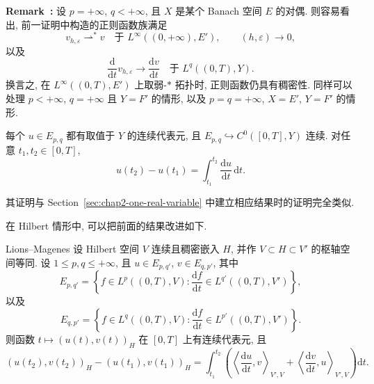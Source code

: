 \par\noindent{}\textbf{Remark~\thechapterfiveremark:}\quad
\label{rem:chap2-epq-weak-star-density}
设 $p=+\infty$, $q<+\infty$, 且 $X$ 是某个 Banach 空间 $E$ 的对偶. 则容易看出, 前一证明中构造的正则函数族满足
\[
 v_{h,\varepsilon}\rightharpoonup^*v
 \quad\text{于 }L^\infty((0,+\infty),E'),
 \qquad (h,\varepsilon)\to0,
\]
以及
\[
 \frac{\mathrm{d}}{\mathrm{d}t}v_{h,\varepsilon}
 \longrightarrow\frac{\mathrm{d}v}{\mathrm{d}t}
 \quad\text{于 }L^q((0,T),Y).
\]
换言之, 在 $L^\infty((0,T),E')$ 上取弱-$*$ 拓扑时, 正则函数仍具有稠密性. 同样可以处理 $p<+\infty$, $q=+\infty$ 且 $Y=F'$ 的情形, 以及 $p=q=+\infty$, $X=E'$, $Y=F'$ 的情形.
\par

\begin{Proposition}
\label{prop:chap2-epq-continuous-representative}
每个 $u\in E_{p,q}$ 都有取值于 $Y$ 的连续代表元, 且 $E_{p,q}\hookrightarrow C^0([0,T],Y)$ 连续. 对任意 $t_1,t_2\in[0,T]$,
\[
 u(t_2)-u(t_1)=\int_{t_1}^{t_2}\frac{\mathrm{d}u}{\mathrm{d}t}\,\mathrm{d}t.
\]
\end{Proposition}

\begin{Proof}
其证明与 Section~\ref{sec:chap2-one-real-variable} 中建立相应结果时的证明完全类似.
\end{Proof}

在 Hilbert 情形中, 可以把前面的结果改进如下.

\begin{Theorem}{Lions--Magenes}
\label{thm:chap2-lions-magenes-product}
设 Hilbert 空间 $V$ 连续且稠密嵌入 $H$, 并作 $V\subset H\subset V'$ 的枢轴空间等同. 设 $1\leq p,q\leq+\infty$, 且 $u\in E_{p,q'}$, $v\in E_{q,p'}$, 其中
\[
 E_{p,q'}=\left\{f\in L^p((0,T),V):
 \frac{\mathrm{d}f}{\mathrm{d}t}\in L^{q'}((0,T),V')\right\},
\]
以及
\[
 E_{q,p'}=\left\{f\in L^q((0,T),V):
 \frac{\mathrm{d}f}{\mathrm{d}t}\in L^{p'}((0,T),V')\right\}.
\]
则函数 $t\mapsto(u(t),v(t))_H$ 在 $[0,T]$ 上有连续代表元, 且
\[
 (u(t_2),v(t_2))_H-(u(t_1),v(t_1))_H
 =\int_{t_1}^{t_2}\left(
 \left\langle\frac{\mathrm{d}u}{\mathrm{d}t},v\right\rangle_{V',V}
 +\left\langle\frac{\mathrm{d}v}{\mathrm{d}t},u\right\rangle_{V',V}
 \right)\mathrm{d}t.
\]
\end{Theorem}

